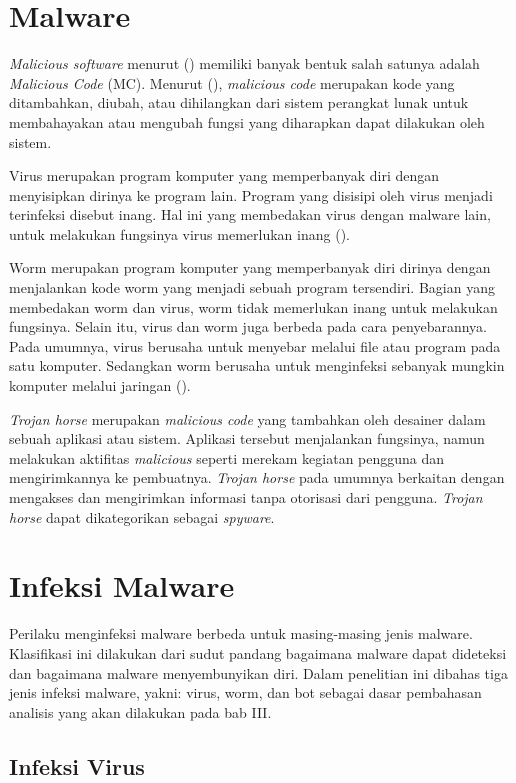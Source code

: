 \section{Malware}
\textit{Malicious software} menurut (\cite{idika2007survey}) memiliki banyak bentuk salah satunya adalah \textit{Malicious Code} (MC). Menurut (\cite{attackingmalcode}), \textit{malicious code} merupakan kode yang ditambahkan, diubah, atau dihilangkan dari sistem perangkat lunak untuk membahayakan atau mengubah fungsi yang diharapkan dapat dilakukan oleh sistem.

Virus merupakan program komputer yang memperbanyak diri dengan menyisipkan dirinya ke program lain. Program yang disisipi oleh virus menjadi terinfeksi disebut inang. Hal ini yang membedakan virus dengan malware lain, untuk melakukan fungsinya virus memerlukan inang (\cite{attackingmalcode}).

Worm merupakan program komputer yang memperbanyak diri dirinya dengan menjalankan kode worm yang menjadi sebuah program tersendiri. Bagian yang membedakan worm dan virus, worm tidak memerlukan inang untuk melakukan fungsinya. Selain itu, virus dan worm juga berbeda pada cara penyebarannya. Pada umumnya, virus berusaha untuk menyebar melalui file atau program pada satu komputer. Sedangkan worm berusaha untuk menginfeksi sebanyak mungkin komputer melalui jaringan (\cite{attackingmalcode}).

\textit{Trojan horse} merupakan \textit{malicious code} yang tambahkan oleh desainer dalam sebuah aplikasi atau sistem. Aplikasi tersebut menjalankan fungsinya, namun melakukan aktifitas \textit{malicious} seperti merekam kegiatan pengguna dan mengirimkannya ke pembuatnya. \textit{Trojan horse} pada umumnya berkaitan dengan mengakses dan mengirimkan informasi tanpa otorisasi dari pengguna. \textit{Trojan horse} dapat dikategorikan sebagai \textit{spyware}. 

\section{Infeksi Malware}
Perilaku menginfeksi malware berbeda untuk masing-masing jenis malware. Klasifikasi ini dilakukan dari sudut pandang bagaimana malware dapat dideteksi dan bagaimana malware menyembunyikan diri. Dalam penelitian ini dibahas tiga jenis infeksi malware, yakni: virus, worm, dan bot sebagai dasar pembahasan analisis yang akan dilakukan pada bab III.

\subsection{Infeksi Virus}

